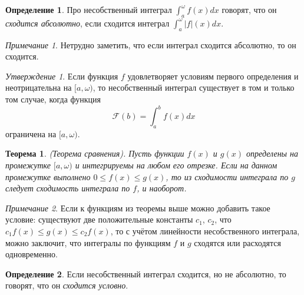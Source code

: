 \documentclass[a4paper,100pt]{article}
\theoremstyle{indented}
\newtheorem{theorem}{Теорема}
\theoremstyle{definition}
\newtheorem{defn}{Определение}
\theoremstyle{remark}
\newtheorem{remark}{Примечание}
\newtheorem{stat}{Утверждение}
\begin{document}
\begin{defn}
    Про несобственный интеграл $\int_a^\omega f(x)dx$ говорят, что он \textit{сходится абсолютно}, если сходится интеграл $\int_a^\omega |f|(x)dx$. 
\end{defn}

\begin{remark}
    Нетрудно заметить, что если интеграл сходится абсолютно, то он сходится.
\end{remark} 

\begin{stat}
    Если функция $f$ удовлетворяет условиям первого определения и неотрицательна на $[a, \omega)$, то несобственный интеграл существует в том и только том случае, когда функция 
    \[
        \mathcal{F}(b)=\int_a^b f(x) dx
    \]
    ограничена на $[a, \omega)$.
\end{stat}

\begin{theorem}
    (Теорема сравнения). Пусть функции $f(x)$ и $g(x)$ определены на промежутке $[a, \omega)$ и интегрируемы на любом его отрезке. Если на данном промежутке выполнено $0\leq f(x) \leq g(x)$, то из сходимости интеграла по $g$ следует сходимость интеграла по $f$, и наоборот. 
\end{theorem}

\begin{remark}
    Если к функциям из теоремы выше можно добавить такое условие: существуют две положительные константы $c_1$, $c_2$, что $c_1f(x)\leq g(x)\leq c_2 f(x)$, то с учётом линейности несобственного интеграла, можно заключит, что интегралы по функциям $f$ и $g$ сходятся или расходятся одновременно.
\end{remark}

\begin{defn}
    Если несобственный интеграл сходится, но не абсолютно, то говорят, что он \textit{сходится условно}.
\end{defn}
\end{document}
